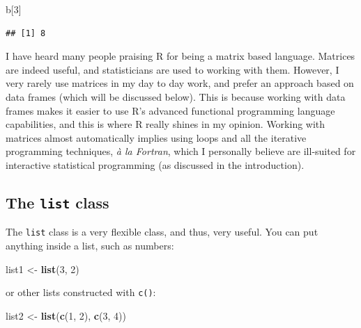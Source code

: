 \documentclass[]{gitbook}
\newenvironment{Shaded}{\begin{snugshade}}{\end{snugshade}}
\newcommand{\DecValTok}[1]{\textcolor[rgb]{0.00,0.00,0.81}{#1}}
\newcommand{\KeywordTok}[1]{\textcolor[rgb]{0.13,0.29,0.53}{\textbf{#1}}}
\newcommand{\NormalTok}[1]{#1}
\newcommand{\StringTok}[1]{\textcolor[rgb]{0.31,0.60,0.02}{#1}}
\begin{document}
\begin{Shaded}
\begin{Highlighting}[]
\NormalTok{b[}\DecValTok{3}\NormalTok{]}
\end{Highlighting}
\end{Shaded}

\begin{verbatim}
## [1] 8
\end{verbatim}

I have heard many people praising R for being a matrix based language. Matrices are indeed useful,
and statisticians are used to working with them. However, I very rarely use matrices in my
day to day work, and prefer an approach based on data frames (which will be discussed below). This
is because working with data frames makes it easier to use R's advanced functional programming
language capabilities, and this is where R really shines in my opinion. Working with matrices
almost automatically implies using loops and all the iterative programming techniques, \emph{à la Fortran},
which I personally believe are ill-suited for interactive statistical programming (as discussed in
the introduction).

\hypertarget{the-list-class}{%
\subsection{\texorpdfstring{The \texttt{list} class}{The list class}}\label{the-list-class}}

The \texttt{list} class is a very flexible class, and thus, very useful. You can put anything inside a list,
such as numbers:

\begin{Shaded}
\begin{Highlighting}[]
\NormalTok{list1 <-}\StringTok{ }\KeywordTok{list}\NormalTok{(}\DecValTok{3}\NormalTok{, }\DecValTok{2}\NormalTok{)}
\end{Highlighting}
\end{Shaded}

or other lists constructed with \texttt{c()}:

\begin{Shaded}
\begin{Highlighting}[]
\NormalTok{list2 <-}\StringTok{ }\KeywordTok{list}\NormalTok{(}\KeywordTok{c}\NormalTok{(}\DecValTok{1}\NormalTok{, }\DecValTok{2}\NormalTok{), }\KeywordTok{c}\NormalTok{(}\DecValTok{3}\NormalTok{, }\DecValTok{4}\NormalTok{))}
\end{Highlighting}
\end{Shaded}
\end{document}
